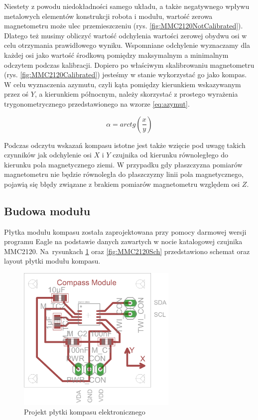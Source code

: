 Niestety z powodu niedokładności samego układu, a także negatywnego wpływu
metalowych elementów konstrukcji robota i modułu, wartość zerowa magnetometru
może ulec przemieszczeniu (rys. \ref{fig:MMC2120NotCalibrated}). Dlatego też
musimy obliczyć wartość odchylenia wartości zerowej obydwu osi  w celu otrzymania
prawidłowego wyniku. Wspomniane odchylenie wyznaczamy dla każdej osi jako wartość
środkową pomiędzy maksymalnym a minimalnym odczytem podczas kalibracji.
Dopiero po właściwym skalibrowaniu magnetometru (rys.
\ref{fig:MMC2120Calibrated}) jesteśmy w stanie wykorzystać go jako kompas. W celu
wyznaczenia azymutu, czyli kąta pomiędzy kierunkiem wskazywanym przez oś $Y$, a
kierunkiem północnym, należy skorzystać z prostego wyrażenia trygonometrycznego
przedstawionego na wzorze \ref{eq:azymut}.

\begin{equation}
  \label{eq:azymut}
  \alpha = arctg \left( \frac{x}{y} \right)
\end{equation}

Podczas odczytu wskazań kompasu istotne jest także wzięcie pod uwagę takich
czynników jak odchylenie osi $X$ i $Y$ czujnika od kierunku równoległego do
kierunku pola magnetycznego ziemi. W przypadku gdy płaszczyzna pomiarów
magnetometru nie będzie równoległa do płaszczyzny linii pola magnetycznego,
pojawią się błędy związane z brakiem pomiarów magnetometru względem osi $Z$.

\subsection{Budowa modułu}
Płytka modułu kompasu została zaprojektowana przy pomocy darmowej wersji programu
Eagle na podstawie danych zawartych w nocie katalogowej czujnika MMC2120.
Na~rysunkach \ref{fig:MMC2120Pcb} oraz \ref{fig:MMC2120Sch} przedstawiono schemat
oraz layout płytki modułu kompasu.

\begin{figure}[!ht]
 \centering
 \includegraphics[height=70mm]{../images/ch04/mmc2120mgpcb.png}
 \caption{Projekt płytki kompasu elektronicznego}
 \label{fig:MMC2120Pcb}
\end{figure}

